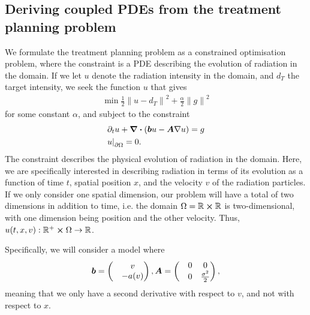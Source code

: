 \documentclass{article}  %
\begin{document}
\subsection{Deriving coupled PDEs from the treatment planning problem}







We formulate the treatment planning problem as a constrained optimisation problem, where the constraint is a PDE describing the evolution of radiation in the domain. If we let $u$ denote the radiation intensity in the domain, and $d_T$ the target intensity, we seek the function $u$ that gives
%
\begin{align} 
    \label{eq:to-minimise}
    \min \frac{1}{2} {\lVert u - d_T \rVert}^2 + \frac{\alpha}{2} {\lVert g \rVert}^2
\end{align}
%
for some constant $\alpha$, and subject to the constraint
%
\begin{align}
    \label{eq:pde-constraint}
    &\partial_t u + \div{(\boldsymbol{b} u - \boldsymbol{A} \nabla u)} = g\\
    &{u \rvert}_{\partial \Omega} = 0.
\end{align}
%
The constraint describes the physical evolution of radiation in the domain. Here, we are specifically interested in describing radiation in terms of its evolution as a function of time $t$, spatial position $x$, and the velocity $v$ of the radiation particles. If we only consider one spatial dimension, our problem will have a total of two dimensions in addition to time, i.e. the domain $\Omega=\mathbb{R}\cross\mathbb{R}$ is two-dimensional, with one dimension being position and the other velocity. Thus, $u(t,x,v): \mathbb{R}^{+} \cross \Omega \rightarrow \mathbb{R}$.

Specifically, we will consider a model where
%
\begin{equation}
\boldsymbol{b} = 
\begin{pmatrix}
    &v\\
    &-a(v)
\end{pmatrix},
\boldsymbol{A} = 
\begin{pmatrix}
    &0 &0\\
    &0 &\frac{\sigma^2}{2}
\end{pmatrix},
\end{equation}
%
meaning that we only have a second derivative with respect to $v$, and not with respect to $x$.
\end{document}
